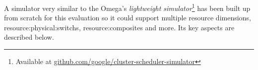 A simulator very similar to the Omega's \cite{omega} \textit{lightweight simulator}\footnote[2]{\label{omega_simulator} Available at \href{https://github.com/google/cluster-scheduler-simulator}{github.com/google/cluster-scheduler-simulator}} has been built up from scratch for this evaluation so it could support multiple resource dimensions, \glspl{resource:physical:switch}, \glspl{resource:composite} and more.
Its key aspects are described below.